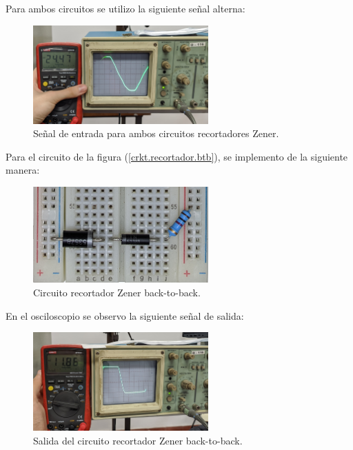 \documentclass[chaptersright]{informeutn}
\begin{document}
      Para ambos circuitos se utilizo la siguiente señal alterna:
      \begin{figure}[H]
        \centering
        \includegraphics[width=0.6\textwidth]{pictures/osc_mult-vac-crkt3-crkt4.jpg}
        \caption{Señal de entrada para ambos circuitos recortadores Zener.}
      \end{figure}


      Para el circuito de la figura (\ref{crkt.recortador.btb}), se implemento de la siguiente manera:
      \begin{figure}[H]
        \centering
        \includegraphics[width=0.6\textwidth]{pictures/prot_crkt3.jpg}
        \caption{Circuito recortador Zener back-to-back.}
      \end{figure}

      En el osciloscopio se observo la siguiente señal de salida:
      \begin{figure}[H]
        \centering
        \includegraphics[width=0.6\textwidth]{pictures/osc_mult-vd_crkt-3.jpg}
        \caption{Salida del circuito recortador Zener back-to-back.}
      \end{figure}
\end{document}
